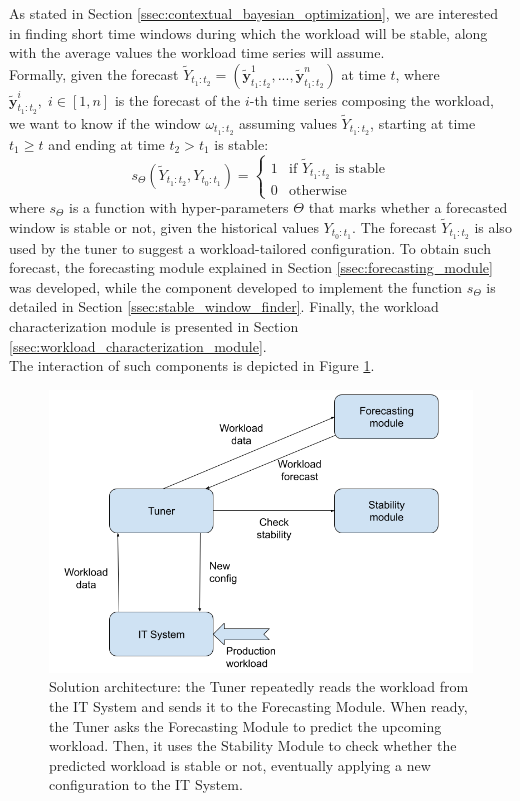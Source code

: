 \documentclass[a4paper, 12pt]{article} %
\begin{document}
	As stated in Section \ref{ssec:contextual_bayesian_optimization}, we are interested in finding short time windows during which the workload will be stable, along with the average values the workload time series will assume. \\
	Formally, given the forecast $\tilde{Y}_{t_1:t_2} = (\tilde{\pmb{y}}_{t_1:t_2}^1, ..., \tilde{\pmb{y}}_{t_1:t_2}^n)$ at time $t$, where $\tilde{\pmb{y}}_{t_1:t_2}^i, \; i\in [1, n]$ is the forecast of the $i$-th time series composing the workload, we want to know if the window $\omega_{t_1:t_2}$ assuming values $\tilde{Y}_{t_1:t_2}$, starting at time $t_1 \geq t$ and ending at time $t_2 > t_1$ is stable: 
	\begin{equation}
		s_\Theta(\tilde{Y}_{t_1:t_2}, Y_{t_0:t_1}) = \begin{cases}
			1 & \text{if $\tilde{Y}_{t_1:t_2}$ is stable}\\
			0 & \text{otherwise}
		\end{cases}    
	\end{equation}
	where $s_\Theta$ is a function with hyper-parameters $\Theta$ that marks whether a forecasted window is stable or not, given the historical values $Y_{t_0:t_1}$. The forecast $\tilde{Y}_{t_1:t_2}$ is also used by the tuner to suggest a workload-tailored configuration.
	To obtain such forecast, the forecasting module explained in Section \ref{ssec:forecasting_module} was developed, while the component developed to implement the function $s_\Theta$ is detailed in Section \ref{ssec:stable_window_finder}. Finally, the workload characterization module is presented in Section \ref{ssec:workload_characterization_module}. \\
	The interaction of such components is depicted in Figure \ref{fig:modules_interaction}.
	
	\begin{figure}[!hb] \centering
		\includegraphics[width=\linewidth]{img/modules_interaction.png}
		\caption{Solution architecture: the Tuner repeatedly reads the workload from the IT System and sends it to the Forecasting Module. When ready, the Tuner asks the Forecasting Module to predict the upcoming workload. Then, it uses the Stability Module to check whether the predicted workload is stable or not, eventually applying a new configuration to the IT System. }
		\label{fig:modules_interaction}
	\end{figure}
	
\end{document}
